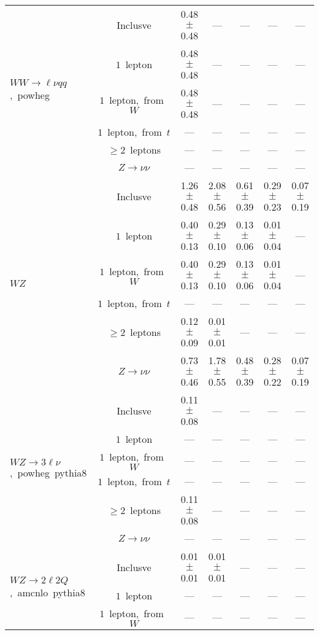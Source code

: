 \documentclass{article}
\begin{document}
\begin{longtable}{|l|c|c|c|c|c|c|}
\hline 
\multirow{6}{*}{$WW{\rightarrow}{\ell}{\nu}qq$,~powheg} & Inclusve  & 0.48 $\pm$ 0.48  & ---  & ---  & ---  & --- \\* 
 & $1$~lepton  & 0.48 $\pm$ 0.48  & ---  & ---  & ---  & --- \\* 
 & $1$~lepton,~from~$W$  & 0.48 $\pm$ 0.48  & ---  & ---  & ---  & --- \\* 
 & $1$~lepton,~from~$t$  & ---  & ---  & ---  & ---  & --- \\* 
 & $\ge2$~leptons  & ---  & ---  & ---  & ---  & --- \\* 
 & $Z\rightarrow\nu\nu$  & ---  & ---  & ---  & ---  & --- \\* 
\hline 
\multirow{6}{*}{$WZ$} & Inclusve  & 1.26 $\pm$ 0.48  & 2.08 $\pm$ 0.56  & 0.61 $\pm$ 0.39  & 0.29 $\pm$ 0.23  & 0.07 $\pm$ 0.19 \\* 
 & $1$~lepton  & 0.40 $\pm$ 0.13  & 0.29 $\pm$ 0.10  & 0.13 $\pm$ 0.06  & 0.01 $\pm$ 0.04  & --- \\* 
 & $1$~lepton,~from~$W$  & 0.40 $\pm$ 0.13  & 0.29 $\pm$ 0.10  & 0.13 $\pm$ 0.06  & 0.01 $\pm$ 0.04  & --- \\* 
 & $1$~lepton,~from~$t$  & ---  & ---  & ---  & ---  & --- \\* 
 & $\ge2$~leptons  & 0.12 $\pm$ 0.09  & 0.01 $\pm$ 0.01  & ---  & ---  & --- \\* 
 & $Z\rightarrow\nu\nu$  & 0.73 $\pm$ 0.46  & 1.78 $\pm$ 0.55  & 0.48 $\pm$ 0.39  & 0.28 $\pm$ 0.22  & 0.07 $\pm$ 0.19 \\* 
\hline 
\multirow{6}{*}{$WZ{\rightarrow}3\ell\nu$,~powheg~pythia8} & Inclusve  & 0.11 $\pm$ 0.08  & ---  & ---  & ---  & --- \\* 
 & $1$~lepton  & ---  & ---  & ---  & ---  & --- \\* 
 & $1$~lepton,~from~$W$  & ---  & ---  & ---  & ---  & --- \\* 
 & $1$~lepton,~from~$t$  & ---  & ---  & ---  & ---  & --- \\* 
 & $\ge2$~leptons  & 0.11 $\pm$ 0.08  & ---  & ---  & ---  & --- \\* 
 & $Z\rightarrow\nu\nu$  & ---  & ---  & ---  & ---  & --- \\* 
\hline 
\multirow{6}{*}{$WZ{\rightarrow}2{\ell}2Q$,~amcnlo~pythia8} & Inclusve  & 0.01 $\pm$ 0.01  & 0.01 $\pm$ 0.01  & ---  & ---  & --- \\* 
 & $1$~lepton  & ---  & ---  & ---  & ---  & --- \\* 
 & $1$~lepton,~from~$W$  & ---  & ---  & ---  & ---  & --- \\* 

\end{longtable}
\end{document}
